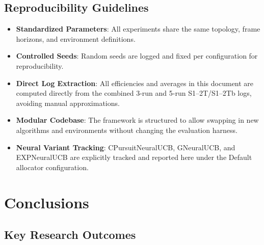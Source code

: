 \documentclass[12pt,a4paper]{article}
\begin{document}
\subsection{Reproducibility Guidelines}

\begin{itemize}
\item \textbf{Standardized Parameters}: All experiments share the same topology, frame horizons, and environment definitions.
\item \textbf{Controlled Seeds}: Random seeds are logged and fixed per configuration for reproducibility.
\item \textbf{Direct Log Extraction}: All efficiencies and averages in this document are computed directly from the combined 3-run and 5-run S1–2T/S1–2Tb logs, avoiding manual approximations.
\item \textbf{Modular Codebase}: The framework is structured to allow swapping in new algorithms and environments without changing the evaluation harness.
\item \textbf{Neural Variant Tracking}: CPursuitNeuralUCB, GNeuralUCB, and EXPNeuralUCB are explicitly tracked and reported here under the Default allocator configuration.
\end{itemize}

\newpage
\section{Conclusions}

\subsection{Key Research Outcomes}
\end{document}
